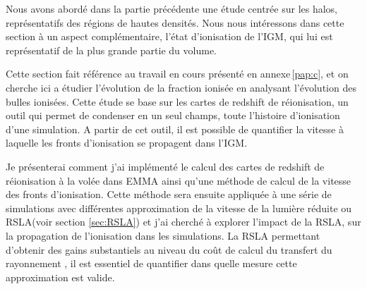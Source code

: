 Nous avons abordé dans la partie précédente une étude centrée sur les halos, représentatifs des régions de hautes densités. %
Nous nous intéressons dans cette section à un aspect complémentaire, l'état d'ionisation de l'\ac{IGM}, qui lui est représentatif de la plus grande partie du volume.

Cette section fait référence au travail en cours présenté en annexe\,\ref{pap:c}, et on cherche ici a étudier l’évolution de la fraction ionisée en analysant l'évolution des bulles ionisées.
Cette étude se base sur les cartes de redshift de réionisation, un outil qui permet de condenser en un seul champs, toute l'histoire d'ionisation d'une simulation.
A partir de cet outil, il est possible de quantifier la vitesse à laquelle les fronts d'ionisation se propagent dans l'\ac{IGM}.

Je présenterai comment j'ai implémenté le calcul des cartes de redshift de réionisation à la volée dans EMMA ainsi qu'une méthode de calcul de la vitesse des fronts d'ionisation.
Cette méthode sera ensuite appliquée à une série de simulations avec différentes approximation de la vitesse de la lumière réduite ou \ac{RSLA}(voir section \ref{sec:RSLA}) et j'ai cherché à explorer l'impact de la \ac{RSLA}, sur la propagation de l'ionisation dans les simulations.
La \ac{RSLA} permettant d'obtenir des gains substantiels au niveau du coût de calcul du transfert du rayonnement \citep{rosdahl_ramsesrt_2013, aubert_radiative_2008, 2001NewA....6..437G}, il est essentiel de quantifier dans quelle mesure cette approximation est valide.




%


